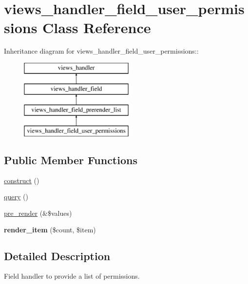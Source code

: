 \hypertarget{classviews__handler__field__user__permissions}{
\section{views\_\-handler\_\-field\_\-user\_\-permissions Class Reference}
\label{classviews__handler__field__user__permissions}
}
Inheritance diagram for views\_\-handler\_\-field\_\-user\_\-permissions::\begin{figure}[H]
\begin{center}
\leavevmode
\includegraphics[height=4cm]{classviews__handler__field__user__permissions}
\end{center}
\end{figure}
\subsection*{Public Member Functions}
\begin{DoxyCompactItemize}
\item 
\hyperlink{classviews__handler__field__user__permissions_aac3a7f41e457a5d5e858deb4c955c1af}{construct} ()
\item 
\hyperlink{classviews__handler__field__user__permissions_a45d41134545829f078afa6a477eee823}{query} ()
\item 
\hyperlink{classviews__handler__field__user__permissions_a9c3969e0483e3d161e627e3d6ba5d78e}{pre\_\-render} (\&\$values)
\item 
\hypertarget{classviews__handler__field__user__permissions_a23e270b8f63e95133405f2069dbbc62b}{
{\bfseries render\_\-item} (\$count, \$item)}
\label{classviews__handler__field__user__permissions_a23e270b8f63e95133405f2069dbbc62b}

\end{DoxyCompactItemize}


\subsection{Detailed Description}
Field handler to provide a list of permissions. 

